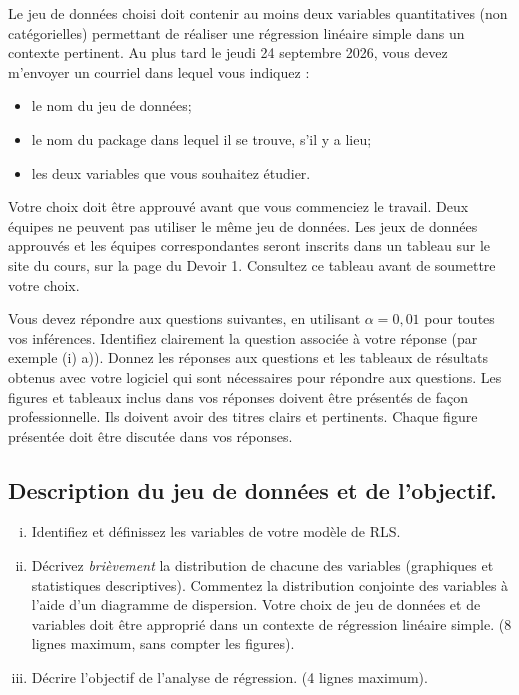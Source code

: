 \begin{questions}
Le jeu de données choisi doit contenir au moins deux variables quantitatives (non catégorielles) permettant de réaliser une régression linéaire simple dans un contexte pertinent. Au plus tard le jeudi 24 septembre 2026, vous devez m’envoyer un courriel dans lequel vous indiquez :
\begin{itemize}
    \item le nom du jeu de données;
    \item le nom du package dans lequel il se trouve, s’il y a lieu;
    \item les deux variables que vous souhaitez étudier.
\end{itemize}
Votre choix doit être approuvé avant que vous commenciez le travail. Deux équipes ne peuvent pas utiliser le même jeu de données. Les jeux de données approuvés et les équipes correspondantes seront inscrits dans un tableau sur le site du cours, sur la page du Devoir 1. Consultez ce tableau avant de soumettre votre choix.

Vous devez répondre aux questions suivantes,  en utilisant $\alpha = 0,01$ pour toutes vos inférences. Identifiez clairement la question associée à votre réponse (par exemple (i) a)). Donnez les réponses aux questions et les tableaux de résultats obtenus avec votre logiciel qui sont nécessaires pour
répondre aux questions. Les figures et tableaux inclus dans vos réponses doivent être présentés de façon professionnelle. Ils doivent avoir des titres clairs et pertinents. Chaque figure présentée doit être discutée dans vos réponses. 

\begin{parts}
	\part[9] {\bf Description du jeu de données et de l'objectif.}
\begin{enumerate}[(i)]
\item Identifiez et définissez les variables de votre modèle de RLS.%
\item Décrivez {\it brièvement} la distribution de chacune des variables (graphiques et statistiques descriptives). Commentez la distribution conjointe des variables à l'aide d'un diagramme de dispersion. Votre choix de jeu de données et de variables doit être approprié dans un contexte de régression linéaire simple. (8 lignes maximum, sans compter les figures). %
\item Décrire l'objectif de l'analyse de régression. (4 lignes maximum).%
\end{enumerate}

\end{parts}
\end{questions}
